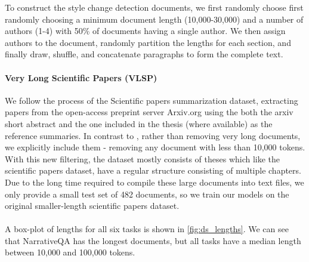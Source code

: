 \documentclass[10pt, a4paper]{article}
\begin{document}
To construct the style change detection documents, we first randomly choose first randomly choosing a minimum document length (10,000-30,000) and a number of authors (1-4) with 50\% of documents having a single author. We then assign authors to the document, randomly partition the lengths for each section, and finally draw, shuffle, and concatenate paragraphs to form the complete text.

\paragraph{Very Long Scientific Papers (VLSP)}
We follow the process of the Scientific papers \cite{Cohan_2018} summarization dataset, extracting papers from the open-access preprint server Arxiv.org using the both the arxiv short abstract and the one included in the thesis (where available) as the reference summaries. In contrast to , rather than removing very long documents, we explicitly include them - removing any document with less than 10,000 tokens. With this new filtering, the dataset mostly consists of theses which like the scientific papers dataset, have a regular structure consisting of multiple chapters. Due to the long time required to compile these large documents into text files, we only provide a small test set of 482 documents, so we train our models on the original smaller-length scientific papers dataset.

\paragraph{
}A box-plot of lengths for all six tasks is shown in \autoref{fig:ds_lengths}. We can see that NarrativeQA has the longest documents, but all tasks have a median length between 10,000 and 100,000 tokens. 
\end{document}
